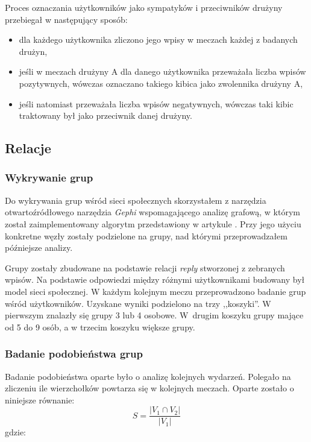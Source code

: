 Proces oznaczania użytkowników jako sympatyków i przeciwników drużyny przebiegał
w następujący sposób:
\begin{itemize}
  \item dla każdego użytkownika zliczono jego wpisy w meczach każdej z badanych 
  drużyn,
  \item jeśli w meczach drużyny A dla danego użytkownika przeważała liczba 
  wpisów pozytywnych, wówczas oznaczano takiego kibica jako zwolennika drużyny A,
  \item jeśli natomiast przeważała liczba wpisów negatywnych, wówczas taki kibic
  traktowany był jako przeciwnik danej drużyny.  
\end{itemize} 

\subsection{Relacje}



\subsubsection{Wykrywanie grup}
 \label{subsubsection:koncepcja-wykrywaniegrup}
Do wykrywania grup wśród sieci społecznych skorzystałem z narzędzia
otwartoźródłowego narzędzia \textit{Gephi} wspomagającego analizę grafową, w
którym został zaimplementowany algorytm przedstawiony w artykule
\cite{blondel2008fuc}. Przy jego użyciu konkretne węzły zostały podzielone
na grupy, nad którymi przeprowadzałem późniejsze analizy.

Grupy zostały zbudowane na podstawie relacji \textit{reply}
stworzonej z zebranych wpisów. Na podstawie odpowiedzi między różnymi
użytkownikami budowany był model sieci społecznej.
W każdym kolejnym meczu przeprowadzono badanie grup wśród użytkowników.
Uzyskane wyniki podzielono na trzy ,,koszyki''. W pierwszym znalazły się grupy 
3 lub 4 osobowe. W~drugim koszyku grupy mające od 5 do 9 osób, a w trzecim koszyku
większe grupy. 


\subsubsection{Badanie podobieństwa grup}
\label{subsection:badaniepodobienstwagrup}
Badanie podobieństwa oparte było o analizę kolejnych wydarzeń. 
Polegało na zliczeniu ile wierzchołków powtarza się w kolejnych meczach.
Oparte zostało o niniejsze równanie:
\begin{equation}
S = \frac{|V_1 \cap V_2|}{|V_1|}
\end{equation}  
gdzie:


